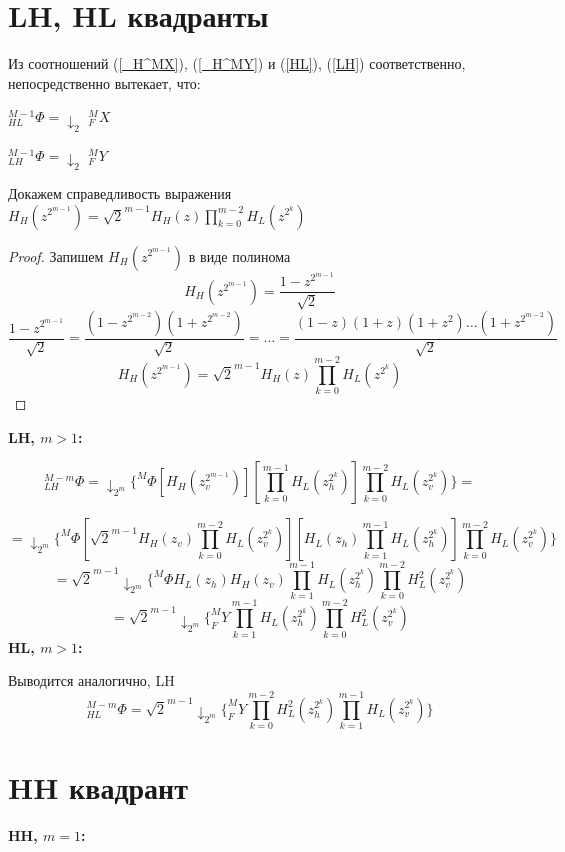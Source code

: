 \documentclass[oneside, final, 14pt]{extreport}
\begin{document}
\section{LH, HL квадранты}
Из соотношений (\ref{_H^MX}), (\ref{_H^MY}) и (\ref{HL}), (\ref{LH}) соответственно, непосредственно вытекает, что:
\begin{center}

$ 	_{HL}^{M-1}\Phi = \downarrow_{2}$ $ _F^MX $ 

$ 	_{LH}^{M-1}\Phi = \downarrow_{2}$ $ _F^MY $

\end{center}

Докажем справедливость выражения $H_{H}(z^{2^{m-1}}) = \sqrt{2}^{m-1} H_H(z) \prod \limits_{k=0}^{m-2} H_L(z^{2^k})$
\begin{proof}
Запишем $H_{H}(z^{2^{m-1}})$ в виде полинома
$$H_{H}(z^{2^{m-1}}) = \frac{1 - z^{2^{m-1}}}{\sqrt{2}}$$
$$\frac{1 - z^{2^{m-1}}}{\sqrt{2}} = \frac{(1-z^{2^{m-2}})(1+z^{2^{m-2}})}{\sqrt{2}}=\ldots=\frac{(1-z)(1+z)(1+z^2)\ldots(1+z^{2^{m-2}})}{\sqrt{2}}$$
$$H_{H}(z^{2^{m-1}}) = \sqrt{2}^{m-1} H_H(z) \prod \limits_{k=0}^{m-2} H_L(z^{2^k})$$
\end{proof}

\textbf{LH, $m>1$:}

\[
_{LH}^{M-m}\Phi=
\downarrow_{2^m} \{^M\Phi [H_H(z_v^{2^{m-1}})] [\prod\limits_{k = 0}^{m-1} H_L(z_h^{2^k})]
							\prod\limits_{k = 0}^{m-2} H_L(z_v^{2^k})\}=\]
							
\[
=\downarrow_{2^m} \{^M\Phi [\sqrt{2}^{m-1} H_H(z_v) \prod \limits_{k=0}^{m-2} H_L(z_v^{2^k})]
					[H_L(z_h)\prod \limits_{k=1}^{m-1} H_L(z_h^{2^k})]
					\prod\limits_{k = 0}^{m-2} H_L(z_v^{2^k})
\}			
\]
\[
=\sqrt{2}^{m-1} \downarrow_{2^m} \{^M\Phi H_L(z_h) H_H(z_v)\prod \limits_{k=1}^{m-1} H_L(z_h^{2^k})\prod \limits_{k=0}^{m-2} H_L^2(z_v^{2^k})
\]
\[
=\sqrt{2}^{m-1} \downarrow_{2^m} \{_F^MY \prod \limits_{k=1}^{m-1} H_L(z_h^{2^k})\prod \limits_{k=0}^{m-2} H_L^2(z_v^{2^k})
\]
\textbf{HL, $m>1$:}

Выводится аналогично, LH
\[_{HL}^{M-m}\Phi=
\sqrt{2}^{m-1} \downarrow_{2^m} \{_F^MY \prod \limits_{k=0}^{m-2} H_L^{2}(z_h^{2^k})\prod \limits_{k=1}^{m-1} H_L(z_v^{2^k})\}
\]

\section{HH квадрант}
\textbf{HH, $m=1$:}
\end{document}
